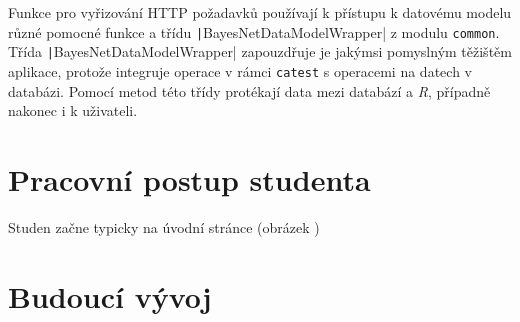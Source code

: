 \documentclass[a4paper,twoside,12pt]{scrbook}
\begin{document}
Funkce pro vyřizování HTTP požadavků používají k přístupu k datovému modelu různé pomocné funkce a třídu \texttt|BayesNetDataModelWrapper| z modulu \texttt{common}. Třída \texttt|BayesNetDataModelWrapper| zapouzdřuje je jakýmsi pomyslným těžištěm aplikace, protože integruje operace v rámci \texttt{catest} s operacemi na datech v databázi. Pomocí metod této třídy protékají data mezi databází a \textit{R}, případně nakonec i k uživateli.

\section{Pracovní postup studenta}
Studen začne typicky na úvodní stránce (obrázek )

\section{Budoucí vývoj}




%
%
%
%
\end{document}
